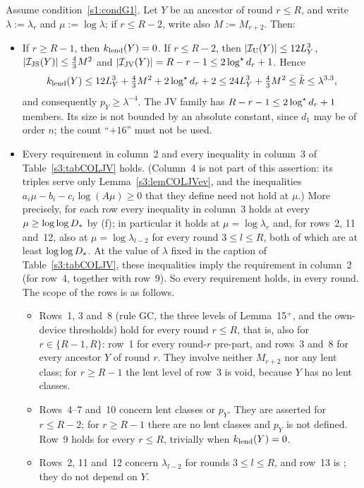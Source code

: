 \begin{lemma}\label{s3:lemCOLJV}
Assume condition~\ref{s1:condG1}. Let $Y$ be an ancestor of round $r\le R$, and write
$\lambda:=\lambda_r$ and $\mu:=\log\lambda$; if $r\le R-2$, write also $M:=M_{r+2}$. Then:
\begin{itemize}
\item[(i)] If $r\ge R-1$, then $k_{\mathrm{lend}}(Y)=0$. If $r\le R-2$, then
  $|\mathcal{I}_{\mathrm{U}}(Y)|\le12L_Y^3$, $|\mathcal{I}_{\mathrm{JS}}(Y)|\le\frac43M^2$ and
  $|\mathcal{I}_{\mathrm{JV}}(Y)|=R-r-1\le2\log^{\star} d_r+1$. Hence
  \[
  k_{\mathrm{lend}}(Y)\le12L_Y^3+\tfrac43M^2+2\log^{\star} d_r+2\le24L_Y^3+\tfrac43M^2\le\bar k\le\lambda^{3.3},
  \]
  and consequently $p_Y\ge\lambda^{-4}$. The JV family has
  $R-r-1\le2\log^{\star} d_r+1$ members. Its size is not bounded by an
  absolute constant, since $d_1$ may be of order $n$; the count
  ``$+16$'' must not be used.
\item[(ii)] Every requirement in column~2 and every inequality in column~3
  of Table~\ref{s3:tabCOLJV} holds. (Column~4 is not part of this assertion:
  its triples serve only Lemma~\ref{s3:lemCOLJVev}, and the inequalities
  $a_i\mu-b_i-c_i\log(A\mu)\ge0$ that they define need not hold at $\mu$.) More
  precisely, for each row every inequality in column~3 holds at every
  $\mu\ge\log\log D_{*}$ by (f); in particular it holds at
  $\mu=\log\lambda_r$ and, for rows~2, 11 and~12, also at
  $\mu=\log\lambda_{l-2}$ for every round $3\le l\le R$, both of which are
  at least $\log\log D_{*}$. At the value of $\lambda$ fixed in the caption of
  Table~\ref{s3:tabCOLJV}, these inequalities imply the requirement in
  column~2 (for row~4, together with row~9). So every requirement holds, in
  every round.
  The scope of the rows is as follows.
  \begin{itemize}
  \item Rows~1, 3 and~8 (rule GC, the three levels of Lemma~15$^+$, and
    the own-device thresholds) hold for every round $r\le R$, that is,
    also for $r\in\{R-1,R\}$: row~1 for every round-$r$ pre-part, and
    rows~3 and~8 for every ancestor $Y$ of round $r$. They involve
    neither $M_{r+2}$ nor any lent class; for $r\ge R-1$ the lent level
    of row~3 is void, because $Y$ has no lent classes.
  \item Rows~4--7 and~10 concern lent classes or $p_Y$. They are
    asserted for $r\le R-2$; for $r\ge R-1$ there are no lent classes
    and $p_Y$ is not defined. Row~9 holds for every $r\le R$, trivially
    when $k_{\mathrm{lend}}(Y)=0$.
  \item Rows~2, 11 and~12 concern $\lambda_{l-2}$ for rounds
    $3\le l\le R$, and row~13 is \Gstar; they do not depend on $Y$.
  \end{itemize}
\end{itemize}
\deps{\ref{s1:condG1}, \ref{s1:condGstar}, \ref{s2:lemTower}, \ref{s3:defCOL}, \ref{s2:defAncestors}, \ref{s2:propStructure}, \ref{s3:lemL15p}, \ref{s3:thmT16s}}
\end{lemma}

